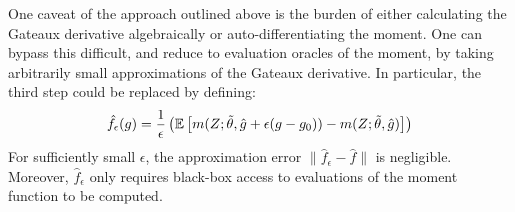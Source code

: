 One caveat of the approach outlined above is the burden of either calculating the Gateaux derivative algebraically or auto-differentiating the moment. One can bypass this difficult, and reduce to evaluation oracles of the moment, by taking arbitrarily small approximations of the Gateaux derivative. In particular, the third step could be replaced by defining:
\begin{equation}
    \hat{f}_{\epsilon}(g) = \frac{1}{\epsilon}\left(\mathbb{E}\left[m(Z;\tilde{\theta}, \hat{g} + \epsilon (g - g_0)) - m(Z;\tilde{\theta}, \hat{g})\right]\right)
\end{equation}
For sufficiently small $\epsilon$, the approximation error $\|\hat{f}_{\epsilon} - \hat{f}\|$ is negligible. Moreover, $\hat{f}_{\epsilon}$ only requires black-box access to evaluations of the moment function to be computed.